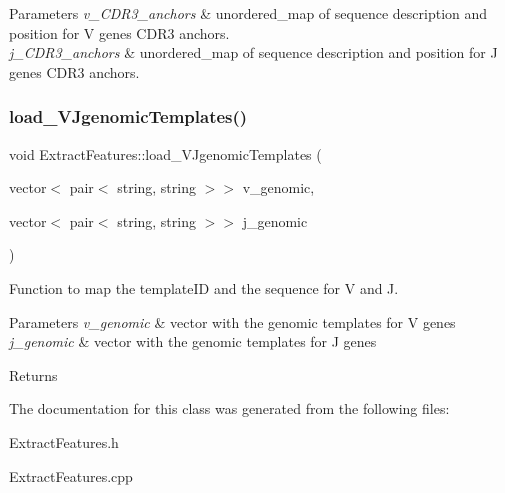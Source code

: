 \begin{DoxyParams}{Parameters}
{\em v\+\_\+\+C\+D\+R3\+\_\+anchors} & unordered\+\_\+map of sequence description and position for V genes C\+D\+R3 anchors. \\
\hline
{\em j\+\_\+\+C\+D\+R3\+\_\+anchors} & unordered\+\_\+map of sequence description and position for J genes C\+D\+R3 anchors. \\
\hline
\end{DoxyParams}
\mbox{\label{classExtractFeatures_a70b5cef5ad48234649b114dea3eba942}} 
\subsubsection{\texorpdfstring{load\+\_\+\+V\+Jgenomic\+Templates()}{load\_VJgenomicTemplates()}}
{\footnotesize\ttfamily void Extract\+Features\+::load\+\_\+\+V\+Jgenomic\+Templates (\begin{DoxyParamCaption}\item[{vector$<$ pair$<$ string, string $>$$>$}]{v\+\_\+genomic,  }\item[{vector$<$ pair$<$ string, string $>$$>$}]{j\+\_\+genomic }\end{DoxyParamCaption})}



Function to map the template\+ID and the sequence for V and J. 


\begin{DoxyParams}{Parameters}
{\em v\+\_\+genomic} & vector with the genomic templates for V genes \\
\hline
{\em j\+\_\+genomic} & vector with the genomic templates for J genes \\
\hline
\end{DoxyParams}
\begin{DoxyReturn}{Returns}

\end{DoxyReturn}


The documentation for this class was generated from the following files\+:\begin{DoxyCompactItemize}
\item 
Extract\+Features.\+h\item 
Extract\+Features.\+cpp\end{DoxyCompactItemize}
